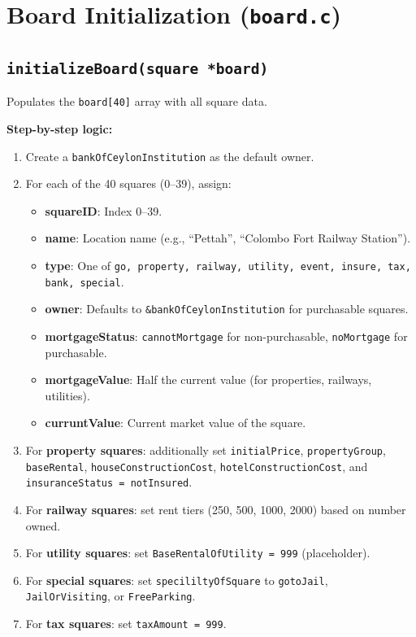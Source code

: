 \documentclass[12pt,a4paper]{article}
\begin{document}
\newpage

\section{Board Initialization (\texttt{board.c})}

\subsection{\texttt{initializeBoard(square *board)}}
Populates the \texttt{board[40]} array with all square data.

\textbf{Step-by-step logic:}
\begin{enumerate}[noitemsep]
    \item Create a \texttt{bankOfCeylonInstitution} as the default owner.
    \item For each of the 40 squares (0--39), assign:
    \begin{itemize}[noitemsep]
        \item \textbf{squareID}: Index 0--39.
        \item \textbf{name}: Location name (e.g., ``Pettah'', ``Colombo Fort Railway Station'').
        \item \textbf{type}: One of \texttt{go, property, railway, utility, event, insure, tax, bank, special}.
        \item \textbf{owner}: Defaults to \texttt{\&bankOfCeylonInstitution} for purchasable squares.
        \item \textbf{mortgageStatus}: \texttt{cannotMortgage} for non-purchasable, \texttt{noMortgage} for purchasable.
        \item \textbf{mortgageValue}: Half the current value (for properties, railways, utilities).
        \item \textbf{curruntValue}: Current market value of the square.
    \end{itemize}
    \item For \textbf{property squares}: additionally set \texttt{initialPrice}, \texttt{propertyGroup}, \texttt{baseRental}, \texttt{houseConstructionCost}, \texttt{hotelConstructionCost}, and \texttt{insuranceStatus = notInsured}.
    \item For \textbf{railway squares}: set rent tiers (250, 500, 1000, 2000) based on number owned.
    \item For \textbf{utility squares}: set \texttt{BaseRentalOfUtility = 999} (placeholder).
    \item For \textbf{special squares}: set \texttt{specililtyOfSquare} to \texttt{gotoJail}, \texttt{JailOrVisiting}, or \texttt{FreeParking}.
    \item For \textbf{tax squares}: set \texttt{taxAmount = 999}.
\end{enumerate}
\end{document}
